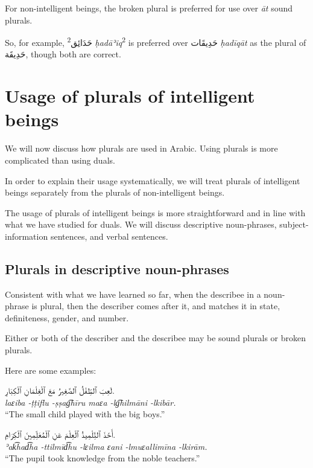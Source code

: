 \documentclass[
  10pt,
]{book}
\begin{document}
For non-intelligent beings, the broken plural is preferred for use over \emph{āt} sound plurals.

So, for example, \textsuperscript{2}\foreignlanguage{arabic}{حَدَائِق} \emph{ḥadāʾiq}\textsuperscript{2} is preferred over \foreignlanguage{arabic}{حَدِيقَات} \emph{ḥadīqāt} as the plural of \foreignlanguage{arabic}{حَدِيقَة}, though both are correct.

\section{Usage of plurals of intelligent beings}\label{usage-of-plurals-of-intelligent-beings}

We will now discuss how plurals are used in Arabic. Using plurals is more complicated than using duals.

In order to explain their usage systematically, we will treat plurals of intelligent beings separately from the plurals of non-intelligent beings.

The usage of plurals of intelligent beings is more straightforward and in line with what we have studied for duals. We will discuss descriptive noun-phrases, subject-information sentences, and verbal sentences.

\subsection{Plurals in descriptive noun-phrases}\label{plurals-in-descriptive-noun-phrases}

Consistent with what we have learned so far, when the describee in a noun-phrase is plural, then the describer comes after it, and matches it in state, definiteness, gender, and number.

Either or both of the describer and the describee may be sound plurals or broken plurals.

Here are some examples:

\foreignlanguage{arabic}{لَعِبَ ٱلطِّفْلُ ٱلصَّغِيرُ مَعَ ٱلْغِلْمَانِ ٱلْکِبَارِ.}\\
\emph{laɛiba -ṭṭiflu -ṣṣag͡hīru maɛa -lg͡hilmāni -lkibār.}\\
\enquote{The small child played with the big boys.}

\foreignlanguage{arabic}{أَخَذَ ٱلتِّلْمِيذُ ٱلْعِلْمَ عَنِ ٱلْمُعَلِّمِينَ ٱلْکِرَامِ.}\\
\emph{ʾak͡had͡ha -ttilmīd͡hu -lɛilma ɛani -lmuɛallimīna -lkirām.}\\
\enquote{The pupil took knowledge from the noble teachers.}
\end{document}
